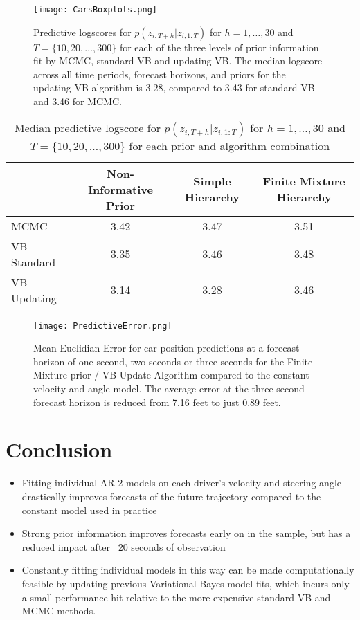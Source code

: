 \documentclass[12pt,a4paper]{article}\usepackage[]{graphicx}\usepackage[]{color}
\begin{document}
\begin{figure}[ht]
\centering
\texttt{[image: CarsBoxplots.png]}
\caption{Predictive logscores for $p(z_{i, T+h} | z_{i, 1:T})$ for $h = 1, \dots, 30$ and $T = \{10, 20, \dots, 300\}$ for each of the three levels of prior information fit by MCMC, standard VB and updating VB. The median logscore across all time periods, forecast horizons, and priors for the updating VB algorithm is 3.28, compared to 3.43 for standard VB and 3.46 for MCMC.}
\label{fig:MainResults}
\end{figure}

\begin{center}
\begin{table}[h]
\begin{tabular}{| l | c | c | c |}
\hline
& Non-Informative Prior & Simple Hierarchy & Finite Mixture Hierarchy \\
\hline
MCMC & 3.42 & 3.47 & 3.51 \\
VB Standard & 3.35 & 3.46 & 3.48 \\
VB Updating & 3.14 & 3.28 & 3.46 \\
\hline
\end{tabular}
\label{tableMedian}
\caption{Median predictive logscore for $p(z_{i, T+h} | z_{i, 1:T})$ for $h = 1, \dots, 30$ and $T = \{10, 20, \dots, 300\}$ for each prior and algorithm combination}
\end{table}
\end{center}

\begin{figure}[ht]
\centering
\texttt{[image: PredictiveError.png]}
\caption{Mean Euclidian Error for car position predictions at a forecast horizon of one second, two seconds or three seconds for the Finite Mixture prior / VB Update Algorithm compared to the constant velocity and angle model. The average error at the three second forecast horizon is reduced from 7.16 feet to just 0.89 feet.}
\label{fig:MainResults}
\end{figure}

\section{Conclusion}
\begin{itemize}
\item Fitting individual AR 2 models on each driver's velocity and steering angle drastically improves forecasts of the future trajectory compared to the constant model used in practice
\item Strong prior information improves forecasts early on in the sample, but has a reduced impact after ~20 seconds of observation
\item Constantly fitting individual models in this way can be made computationally feasible by updating previous Variational Bayes model fits, which incurs only a small performance hit relative to the more expensive standard VB and MCMC methods.
\end{itemize}
\end{document}
